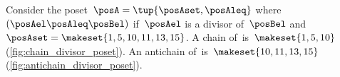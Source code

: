 \vspace{5cm}

\begin{marginfigure}
    \centering
    \caption{}
    \label{fig:chain_divisor_poset}
\end{marginfigure}

\begin{marginfigure}
    \centering
    \caption{}
    \label{fig:antichain_divisor_poset}
\end{marginfigure}

\begin{example}
    Consider the poset~$\posA=\tup{\posAset,\posAleq}$ where~$(\posAel \posAleq \posBel)$ if~$\posAel$ is a divisor of~$\posBel$ and~$\posAset=\makeset{1,5,10,11,13,15}$.
    A chain of~\posA is~$\makeset{1,5,10}$ (\cref{fig:chain_divisor_poset}).
    An antichain of~\posA is~$\makeset{10,11,13,15}$ (\cref{fig:antichain_divisor_poset}).
\end{example}
